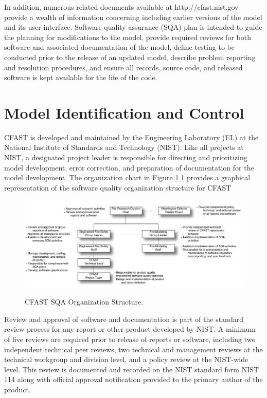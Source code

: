 \documentclass[12pt]{book}
\begin{document}
In addition, numerous related documents available at http://cfast.nist.gov provide a wealth of information concerning including earlier versions of the model and its user interface. Software quality assurance (SQA) plan is intended to guide the planning for modifications to the model, provide required reviews for both software and associated documentation of the model, define testing to be conducted prior to the release of an updated model, describe problem reporting and resolution procedures, and ensure all records, source code, and released software is kept available for the life of the code.

\chapter{Model Identification and Control}

CFAST is developed and maintained by the Engineering Laboratory (EL) at the National Institute of Standards and Technology (NIST). Like all projects at NIST, a designated project leader is responsible for directing and prioritizing model development, error correction, and preparation of documentation for the model development.  The organization chart in Figure \ref{figOrgChart} provides a graphical representation of the software quality organization structure for CFAST

\begin{figure}
\begin{center}
\includegraphics[width=6.5in]{FIGURES/OrgChart.pdf}\\
\end{center}
\caption{CFAST SQA Organization Structure.}
 \label{figOrgChart}
\end{figure}

Review and approval of software and documentation is part of the standard review process for any report or other product developed by NIST. A minimum of five reviews are required prior to release of reports or software, including two independent technical peer reviews, two technical and management reviews at the technical workgroup and division level, and a policy review at the NIST-wide level.  This review is documented and recorded on the NIST standard form NIST 114 along with official approval notification provided to the primary author of the product.
\end{document}
